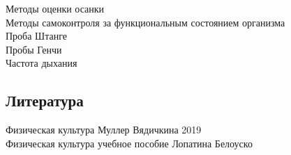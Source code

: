 \documentclass[a4paper, 12pt]{article}
\begin{document}
Методы оценки осанки\\

Методы самоконтроля за функциональным состоянием организма\\
Проба Штанге\\
Пробы Генчи\\
Частота дыхания\\















\newpage
\subsection*{Литература} 
Физическая культура Муллер Вядичкина 2019\\
Физическая культура учебное пособие Лопатина Белоуско \\ 
\end{document}
